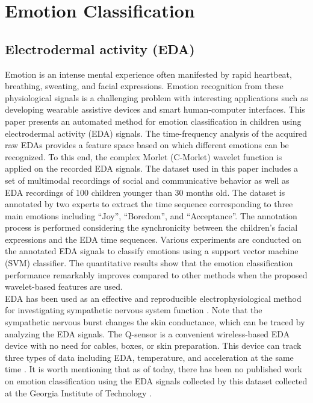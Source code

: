 
\section{Emotion Classification}

\subsection{Electrodermal activity (EDA)}
Emotion is an intense mental experience often manifested by rapid heartbeat, breathing, 
sweating, and facial expressions. Emotion recognition from these physiological signals 
is a challenging problem with interesting applications such as developing wearable 
assistive devices and smart human-computer interfaces. This paper presents an automated 
method for emotion classification in children using electrodermal activity (EDA) signals. 
The time-frequency analysis of the acquired raw EDAs provides a feature space based on 
which different emotions can be recognized. To this end, the complex Morlet (C-Morlet) 
wavelet function is applied on the recorded EDA signals. The dataset used in this paper 
includes a set of multimodal recordings of social and communicative behavior as well 
as EDA recordings of 100 children younger than 30 months old. The dataset is annotated 
by two experts to extract the time sequence corresponding to three main emotions 
including “Joy”, “Boredom”, and “Acceptance”. The annotation process is performed 
considering the synchronicity between the children's facial expressions and the EDA 
time sequences. Various experiments are conducted on the annotated EDA signals to 
classify emotions using a support vector machine (SVM) classifier. The quantitative 
results show that the emotion classification performance remarkably improves compared 
to other methods when the proposed wavelet-based features are used.\\

EDA has been used as an effective and reproducible electrophysiological method for 
investigating sympathetic nervous system function \cite{WearableDevice2016, AssociationBetween2013, SympatheticSkin1984, PrincipalComponent2000}. Note that the sympathetic nervous 
burst changes the skin conductance, which can be traced by analyzing the EDA signals\cite{SkinConduct2006, SympatheticSkin1981, DecodeChild2013}. The Q-sensor 
is a convenient wireless-based EDA device with no need for cables, boxes, or skin 
preparation. This device can track three types of data including EDA, temperature, 
and acceleration at the same time \cite{Validation2013}. It is worth mentioning that 
as of today, there has been no published work on emotion classification using the 
EDA signals collected by this dataset collected at the Georgia Institute of 
Technology \cite{DecodeChild2013}.\\

